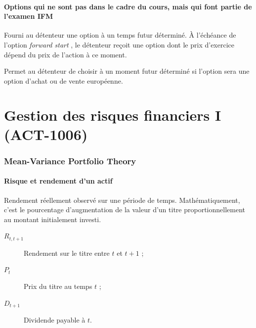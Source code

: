 \documentclass[10pt, french]{article}
\begin{document}
\begin{multicols*}{2}
\columnbreak
\subsection{Options qui ne sont pas dans le cadre du cours, mais qui font partie de l'examen IFM}
\begin{definitionNOHFILLsub}
Fourni au détenteur une option à un temps futur déterminé. À l'échéance de l'option \og \textit{forward start} \fg{}, le détenteur reçoit une option dont le prix d'exercice dépend du prix de l'action à ce moment.	
\end{definitionNOHFILLsub}

\begin{definitionNOHFILLsub}
Permet au détenteur de choisir à un moment futur déterminé si l'option sera une option d'achat ou de vente européenne.
\end{definitionNOHFILLsub}



\pagebreak
\part{Gestion des risques financiers I (ACT-1006)}

\setcounter{section}{6}
\section{Mean-Variance Portfolio Theory}
\subsection{Risque et rendement d'un actif}
\begin{definitionNOHFILL}
Rendement réellement observé sur une période de temps. Mathématiquement, c'est le pourcentage d'augmentation de la valeur d'un titre proportionnellement au montant initialement investi.

\begin{distributions}[Notation]
\begin{description}
	\item[$R_{t, t + 1}$]	Rendement sur le titre entre $t$ et $t + 1$ ;
	\item[$P_{t}$]	Prix du titre au temps $t$ ;
	\item[$D_{t + 1}$]	Dividende payable à $t$.
\end{description}
\end{distributions}


\end{definitionNOHFILL}
\end{multicols*}
\end{document}
